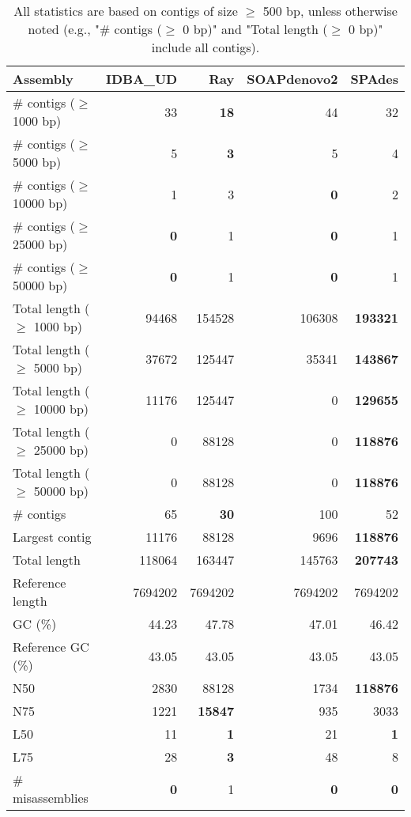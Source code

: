 \documentclass[12pt,a4paper]{article}
\begin{document}
\begin{table}[ht]
\begin{center}
\caption{All statistics are based on contigs of size $\geq$ 500 bp, unless otherwise noted (e.g., "\# contigs ($\geq$ 0 bp)" and "Total length ($\geq$ 0 bp)" include all contigs).}
\begin{tabular}{|l*{4}{|r}|}
\hline
Assembly & IDBA\_UD & Ray & SOAPdenovo2 & SPAdes \\ \hline
\# contigs ($\geq$ 1000 bp) & 33 & {\bf 18} & 44 & 32 \\ \hline
\# contigs ($\geq$ 5000 bp) & 5 & {\bf 3} & 5 & 4 \\ \hline
\# contigs ($\geq$ 10000 bp) & 1 & 3 & {\bf 0} & 2 \\ \hline
\# contigs ($\geq$ 25000 bp) & {\bf 0} & 1 & {\bf 0} & 1 \\ \hline
\# contigs ($\geq$ 50000 bp) & {\bf 0} & 1 & {\bf 0} & 1 \\ \hline
Total length ($\geq$ 1000 bp) & 94468 & 154528 & 106308 & {\bf 193321} \\ \hline
Total length ($\geq$ 5000 bp) & 37672 & 125447 & 35341 & {\bf 143867} \\ \hline
Total length ($\geq$ 10000 bp) & 11176 & 125447 & 0 & {\bf 129655} \\ \hline
Total length ($\geq$ 25000 bp) & 0 & 88128 & 0 & {\bf 118876} \\ \hline
Total length ($\geq$ 50000 bp) & 0 & 88128 & 0 & {\bf 118876} \\ \hline
\# contigs & 65 & {\bf 30} & 100 & 52 \\ \hline
Largest contig & 11176 & 88128 & 9696 & {\bf 118876} \\ \hline
Total length & 118064 & 163447 & 145763 & {\bf 207743} \\ \hline
Reference length & 7694202 & 7694202 & 7694202 & 7694202 \\ \hline
GC (\%) & 44.23 & 47.78 & 47.01 & 46.42 \\ \hline
Reference GC (\%) & 43.05 & 43.05 & 43.05 & 43.05 \\ \hline
N50 & 2830 & 88128 & 1734 & {\bf 118876} \\ \hline
N75 & 1221 & {\bf 15847} & 935 & 3033 \\ \hline
L50 & 11 & {\bf 1} & 21 & {\bf 1} \\ \hline
L75 & 28 & {\bf 3} & 48 & 8 \\ \hline
\# misassemblies & {\bf 0} & 1 & {\bf 0} & {\bf 0} \\ \hline

\end{tabular}
\end{center}
\end{table}
\end{document}
